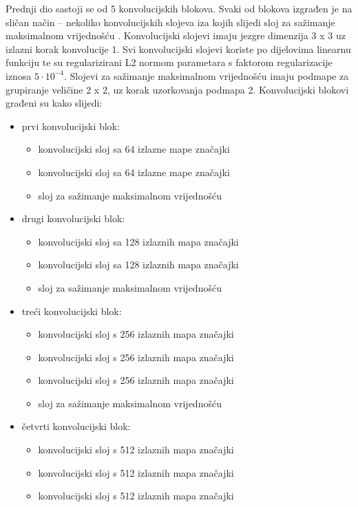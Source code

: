 \documentclass[times, utf8, diplomski, numeric]{fer}
\begin{document}
Prednji dio sastoji se od 5 konvolucijskih blokova. 
Svaki od blokova izgrađen je na sličan način -- nekoliko konvolucijskih slojeva iza kojih slijedi sloj za sažimanje maksimalnom vrijednošću .
Konvolucijski slojevi imaju jezgre dimenzija $3$ x $3$ uz izlazni korak konvolucije  1. 
Svi konvolucijski slojevi koriste po dijelovima linearnu funkciju  te su regularizirani L2 normom parametara s faktorom regularizacije iznosa $5\cdot10^{-4}$.
Slojevi za sažimanje maksimalnom vrijednošću imaju podmape za grupiranje veličine $2$ x $2$, uz korak uzorkovanja podmapa 2.
Konvolucijski blokovi građeni su kako slijedi:
\begin{itemize}
 \item prvi konvolucijski blok:
 \begin{itemize}
  \item konvolucijski sloj sa 64 izlazne mape značajki
  \item konvolucijski sloj sa 64 izlazne mape značajki
  \item sloj za sažimanje maksimalnom vrijednošću
 \end{itemize}
  \item drugi konvolucijski blok:
 \begin{itemize}
  \item konvolucijski sloj sa 128 izlaznih mapa značajki
  \item konvolucijski sloj sa 128 izlaznih mapa značajki
  \item sloj za sažimanje maksimalnom vrijednošću
 \end{itemize}
   \item treći konvolucijski blok:
 \begin{itemize}
  \item konvolucijski sloj s 256 izlaznih mapa značajki
  \item konvolucijski sloj s 256 izlaznih mapa značajki
  \item konvolucijski sloj s 256 izlaznih mapa značajki
  \item sloj za sažimanje maksimalnom vrijednošću
 \end{itemize}
    \item četvrti konvolucijski blok:
 \begin{itemize}
  \item konvolucijski sloj s 512 izlaznih mapa značajki
  \item konvolucijski sloj s 512 izlaznih mapa značajki
  \item konvolucijski sloj s 512 izlaznih mapa značajki

\end{itemize}
\end{itemize}
\end{document}
